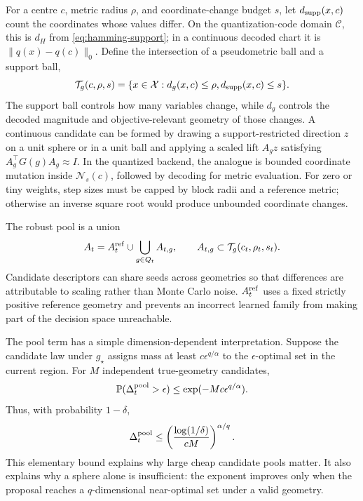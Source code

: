 \documentclass[11pt]{article}
\theoremstyle{definition}
\theoremstyle{remark}
\newcommand{\X}{\mathcal X}
\newcommand{\Tt}{\mathcal T}
\newcommand{\Pp}{\mathbb P}
\newcommand{\1}{\mathbf 1}
\begin{document}
For a centre $c$, metric radius $\rho$, and coordinate-change budget $s$, let
$d_{\rm supp}(x,c)$ count the coordinates whose values differ.  On the quantization-code domain
$\mathcal C$, this is $d_H$ from \eqref{eq:hamming-support}; in a continuous decoded chart it is
$\|q(x)-q(c)\|_0$.  Define the intersection of a pseudometric ball and a support ball,
\begin{equation}\label{eq:trust-region}
  \Tt_g(c,\rho,s)=
  \{x\in\X:d_g(x,c)\le\rho,
  d_{\rm supp}(x,c)\le s\}.
\end{equation}
The support ball controls how many variables change, while $d_g$ controls the decoded magnitude and
objective-relevant geometry of those changes.  A continuous candidate can be formed by drawing a
support-restricted direction $z$ on a unit sphere or in a unit ball and applying a scaled lift
$A_gz$ satisfying $A_g^\top G(g)A_g\approx I$.  In the quantized backend, the analogue is bounded coordinate
mutation inside $\mathcal N_s(c)$, followed by decoding for metric evaluation.  For zero or tiny
weights, step sizes must be capped by block radii and a reference metric; otherwise an inverse square
root would produce unbounded coordinate changes.

The robust pool is a union
\begin{equation}\label{eq:pool-union}
  A_t=A_t^{\rm ref}\cup
  \bigcup_{g\in Q_t}A_{t,g},
  \qquad A_{t,g}\subset\Tt_g(c_t,\rho_t,s_t).
\end{equation}
Candidate descriptors can share seeds across geometries so that differences are attributable to
scaling rather than Monte Carlo noise.  $A_t^{\rm ref}$ uses a fixed strictly positive reference geometry and
prevents an incorrect learned family from making part of the decision space unreachable.

The pool term has a simple dimension-dependent interpretation.  Suppose the candidate law under
$g_\star$ assigns mass at least $c\epsilon^{q/\alpha}$ to the $\epsilon$-optimal set in the current
region.  For $M$ independent true-geometry candidates,
\begin{equation}\label{eq:pool-probability}
  \Pp(\Delta_t^{\rm pool}>\epsilon)
  \le \exp(-Mc\epsilon^{q/\alpha}).
\end{equation}
Thus, with probability $1-\delta$,
\begin{equation}\label{eq:pool-rate}
  \Delta_t^{\rm pool}
  \le
  \left(\frac{\log(1/\delta)}{cM}\right)^{\alpha/q}.
\end{equation}
This elementary bound explains why large cheap candidate pools matter.  It also explains why a
sphere alone is insufficient: the exponent improves only when the proposal reaches a
$q$-dimensional near-optimal set under a valid geometry.
\end{document}
